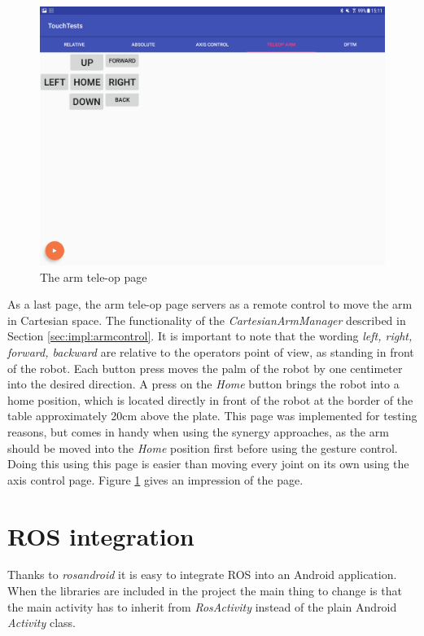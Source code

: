 \begin{figure}
	\caption{\label{fig:ui:teleop}The arm tele-op page}
	\includegraphics[width=0.9\linewidth]{assets/chpt_impl/teleop}
\end{figure}

As a last page, the arm tele-op page servers as a remote control to move the arm in Cartesian space. The functionality of the \textit{CartesianArmManager} described in Section \ref{sec:impl:armcontrol}. It is important to note that the wording \textit{left, right, forward, backward} are relative to the operators point of view, as standing in front of the robot. Each button press moves the palm of the robot by one centimeter into the desired direction. A press on the \textit{Home} button brings the robot into a home position, which is located directly in front of the robot at the border of the table approximately 20cm above the plate. This page was implemented for testing reasons, but comes in handy when using the synergy approaches, as the arm should be moved into the \textit{Home} position first before using the gesture control. Doing this using this page is easier than moving every joint on its own using the axis control page. Figure \ref{fig:ui:teleop} gives an impression of the page.

\section{ROS integration}

Thanks to \textit{rosandroid} it is easy to integrate ROS into an Android application. When the libraries are included in the project the main thing to change is that the main activity has to inherit from \textit{RosActivity} instead of the plain Android \textit{Activity} class.

